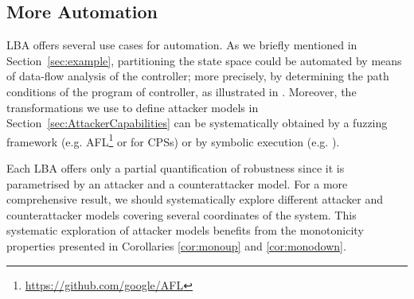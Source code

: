 {{\subsection{More Automation}
LBA offers several use cases for automation. As we briefly mentioned in Section~\ref{sec:example}, partitioning the state space could be automated by means of data-flow analysis of the controller; more precisely, by determining the path conditions of the program of controller, as illustrated in \cite{castellanos2021AttkFinder}. Moreover, the transformations we use to define attacker models in Section~\ref{sec:AttackerCapabilities} can be systematically obtained by a fuzzing framework (e.g. AFL\footnote{\url{https://github.com/google/AFL}} or \cite{chen2019learning} for CPSs) or by symbolic execution (e.g. \cite{castellanos2021AttkFinder}).


Each LBA offers only a partial quantification of robustness since it is parametrised by an attacker and a counterattacker model. For a more comprehensive result, we should systematically explore different attacker and counterattacker models covering several coordinates of the system. This systematic exploration of attacker models benefits from the monotonicity properties presented in Corollaries \ref{cor:monoup} and \ref{cor:monodown}.


}}
